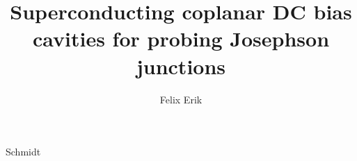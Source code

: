 \documentclass{dissertation-edit}
\begin{document}
\title[]{Superconducting coplanar DC bias cavities for probing Josephson junctions}
\author{Felix Erik}{Schmidt}

%

\newchapstyle
\tableofcontents
\afterpage{\pagecolor{none}}
%
\mainmatter
%
\thumbtrue
%


%
%
%
%
%

%
%
%
\thumbfalse
%
%
%


\end{document}
